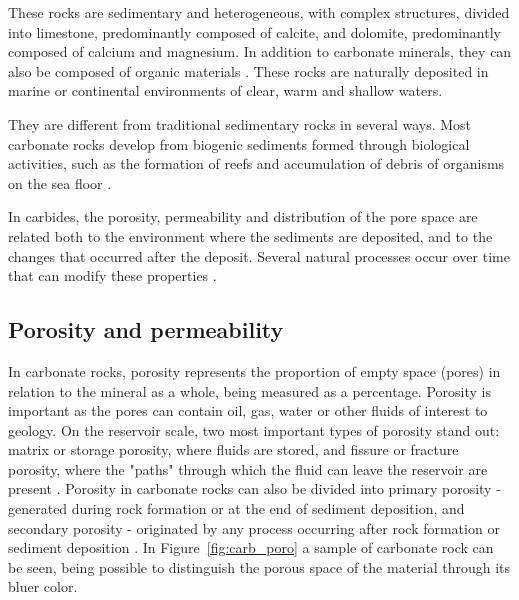 \documentclass[a4paper,fleqn]{cas-sc}
\begin{document}
These rocks are sedimentary and heterogeneous, with complex structures, divided into limestone, predominantly composed of calcite, and dolomite, predominantly composed of calcium and magnesium. In addition to carbonate minerals, they can also be composed of organic materials \cite{Buryakovsky2012}. These rocks are naturally deposited in marine or continental environments of clear, warm and shallow waters.

They are different from traditional sedimentary rocks in several ways. Most carbonate rocks develop from biogenic sediments formed through biological activities, such as the formation of reefs and accumulation of debris of organisms on the sea floor \cite{akbar2000snapshot}.

In carbides, the porosity, permeability and distribution of the pore space are related both to the environment where the sediments are deposited, and to the changes that occurred after the deposit. Several natural processes occur over time that can modify these properties \cite{Buryakovsky2012}.

\subsection{Porosity and permeability}
In carbonate rocks, porosity represents the proportion of empty space (pores) in relation to the mineral as a whole, being measured as a percentage. Porosity is important as the pores can contain oil, gas, water or other fluids of interest to geology. On the reservoir scale, two most important types of porosity stand out: matrix or storage porosity, where fluids are stored, and fissure or fracture porosity, where the "paths" through which the fluid can leave the reservoir are present \cite{Berryman2000}. Porosity in carbonate rocks can also be divided into primary porosity - generated during rock formation or at the end of sediment deposition, and secondary porosity - originated by any process occurring after rock formation or sediment deposition \cite{Harbaugh1967}. In Figure~\ref{fig:carb_poro} a sample of carbonate rock can be seen, being possible to distinguish the porous space of the material through its bluer color.
\end{document}
